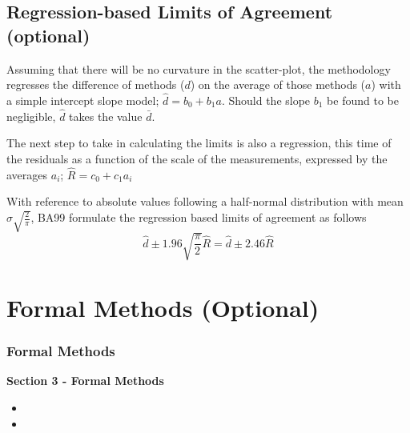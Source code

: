 \documentclass[compress]{beamer}        %
\begin{document}
\begin{frame}

\subsection*{Regression-based Limits of Agreement (optional)} Assuming that
there will be no curvature in the scatter-plot, the methodology
regresses the difference of methods ($d$) on the average of those
methods ($a$) with a simple intercept slope model; $\hat{d} =
b_{0}+ b_{1}a.$ Should the slope $b_{1}$ be found to be
negligible, $\hat{d}$ takes the value $\bar{d}$.

The next step to take in calculating the limits is also a
regression, this time of the residuals as a function of the scale
of the measurements, expressed by the averages $a_{i}$;
 $ \hat{R} = c_{0}+ c_{1}a_{i}$
\end{frame}

\begin{frame}
With reference to absolute values following a half-normal
distribution with mean $\sigma\sqrt{\frac{2}{\pi}}$, \alert{BA99} formulate the regression based limits of agreement as
follows
 \begin{equation}
  \hat{d} \pm 1.96\sqrt{\frac{\pi}{2}}\hat{R} = \hat{d} \pm 2.46\hat{R}
 \end{equation}

\end{frame}

\section{Formal Methods (Optional)}

\begin{frame}
\frametitle{Formal Methods}

\textbf{Section 3 - Formal Methods}
\begin{itemize}
\item
\item
\end{itemize}

\end{frame}
\end{document}
